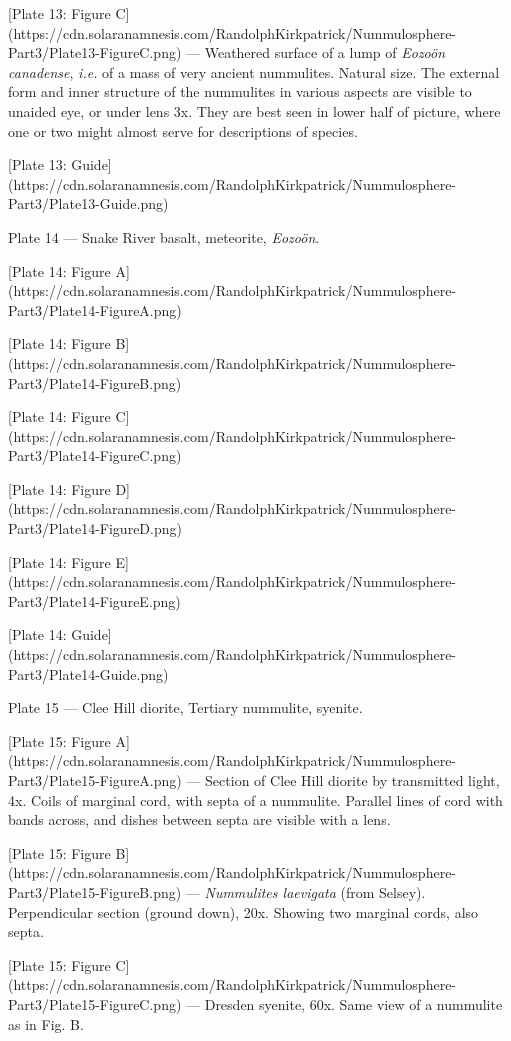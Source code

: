 \documentclass[a4paper, 12pt, oneside]{article}
\begin{document}
[Plate 13: Figure C](https://cdn.solaranamnesis.com/RandolphKirkpatrick/Nummulosphere-Part3/Plate13-FigureC.png) --- Weathered surface of a lump of \emph{Eozoön canadense}, \emph{i.e.} of a mass of very ancient nummulites. Natural size. The external form and inner structure of the nummulites in various aspects are visible to unaided eye, or under lens 3x. They are best seen in lower half of picture, where one or two might almost serve for descriptions of species.

[Plate 13: Guide](https://cdn.solaranamnesis.com/RandolphKirkpatrick/Nummulosphere-Part3/Plate13-Guide.png)

Plate 14 --- Snake River basalt, meteorite, \emph{Eozoön}.

[Plate 14: Figure A](https://cdn.solaranamnesis.com/RandolphKirkpatrick/Nummulosphere-Part3/Plate14-FigureA.png)

[Plate 14: Figure B](https://cdn.solaranamnesis.com/RandolphKirkpatrick/Nummulosphere-Part3/Plate14-FigureB.png)

[Plate 14: Figure C](https://cdn.solaranamnesis.com/RandolphKirkpatrick/Nummulosphere-Part3/Plate14-FigureC.png)

[Plate 14: Figure D](https://cdn.solaranamnesis.com/RandolphKirkpatrick/Nummulosphere-Part3/Plate14-FigureD.png)

[Plate 14: Figure E](https://cdn.solaranamnesis.com/RandolphKirkpatrick/Nummulosphere-Part3/Plate14-FigureE.png)

[Plate 14: Guide](https://cdn.solaranamnesis.com/RandolphKirkpatrick/Nummulosphere-Part3/Plate14-Guide.png)

Plate 15 --- Clee Hill diorite, Tertiary nummulite, syenite.

[Plate 15: Figure A](https://cdn.solaranamnesis.com/RandolphKirkpatrick/Nummulosphere-Part3/Plate15-FigureA.png) --- Section of Clee Hill diorite by transmitted light, 4x. Coils of marginal cord, with septa of a nummulite. Parallel lines of cord with bands across, and dishes between septa are visible with a lens.

[Plate 15: Figure B](https://cdn.solaranamnesis.com/RandolphKirkpatrick/Nummulosphere-Part3/Plate15-FigureB.png) --- \emph{Nummulites laevigata} (from Selsey). Perpendicular section (ground down), 20x. Showing two marginal cords, also septa.

[Plate 15: Figure C](https://cdn.solaranamnesis.com/RandolphKirkpatrick/Nummulosphere-Part3/Plate15-FigureC.png) --- Dresden syenite, 60x. Same view of a nummulite as in Fig. B.
\end{document}
